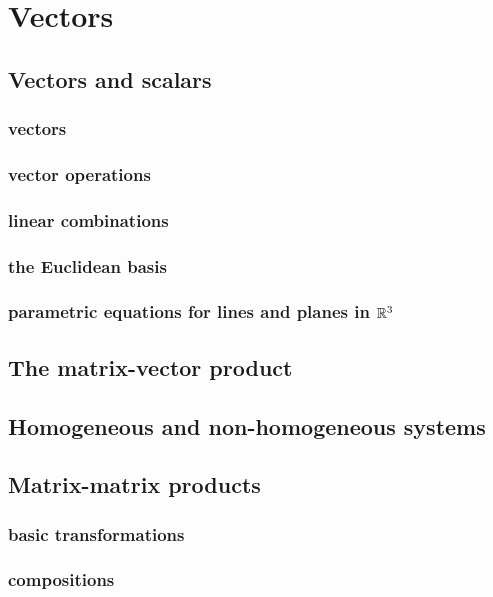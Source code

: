 
\chapter{Vectors}
\label{ch:vectors}

\section{Vectors and scalars}
\label{sec:v_n_s}

\subsection{vectors}
\subsection{vector operations}
\subsection{linear combinations}
\subsection{the Euclidean basis}
\subsection{parametric equations for lines and planes in ${\mathbb R}^3$}

\section{The matrix-vector product}
\label{sec:mv_prod}

\section{Homogeneous and non-homogeneous systems}
\label{sec:homo}

\section{Matrix-matrix products}
\label{sec:matmat}
\subsection{basic transformations}
\subsection{compositions}
